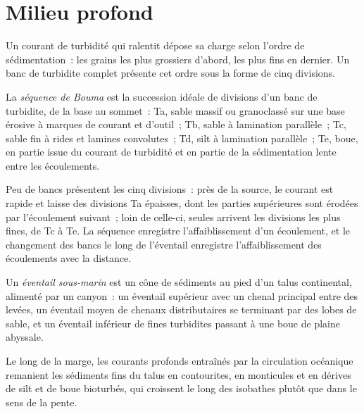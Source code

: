 \section{Milieu profond}\label{sec:b3:facies-models:deep}

Un courant de turbidité qui ralentit dépose sa charge selon l'ordre de sédimentation~:
les grains les plus grossiers d'abord, les plus fins en dernier. Un banc de turbidite complet
présente cet ordre sous la forme de cinq divisions.

\begin{definition}\label{def:b3:facies-models:bouma}
La \emph{séquence de Bouma} est la succession idéale de
divisions d'un banc de turbidite, de la base au sommet~: Ta, sable massif ou granoclassé sur
une base érosive à marques de courant et d'outil~; Tb, sable à lamination parallèle~; Tc,
sable fin à rides et lamines convolutes~; Td, silt à lamination parallèle~;
Te, boue, en partie issue du courant de turbidité et en partie de la sédimentation lente
entre les écoulements.
\end{definition}

Peu de bancs présentent les cinq divisions~: près de la source, le courant est rapide et laisse
des divisions Ta épaisses, dont les parties supérieures sont érodées par l'écoulement suivant~;
loin de celle-ci, seules arrivent les divisions les plus fines, de Tc à Te. La séquence enregistre
l'affaiblissement d'un écoulement, et le changement des bancs le long de l'éventail enregistre
l'affaiblissement des écoulements avec la distance.

\begin{definition}\label{def:b3:facies-models:fan}
Un \emph{éventail sous-marin} est un cône de sédiments au pied
d'un talus continental, alimenté par un canyon~: un éventail supérieur avec un chenal principal
entre des levées, un éventail moyen de chenaux distributaires se terminant par des lobes de sable,
et un éventail inférieur de fines turbidites passant à une boue de plaine abyssale.
\end{definition}

Le long de la marge, les courants profonds entraînés par la circulation océanique remanient
les sédiments fins du talus en contourites, en monticules et en dérives de silt et de boue
bioturbés, qui croissent le long des isobathes plutôt que dans le sens
de la pente.

